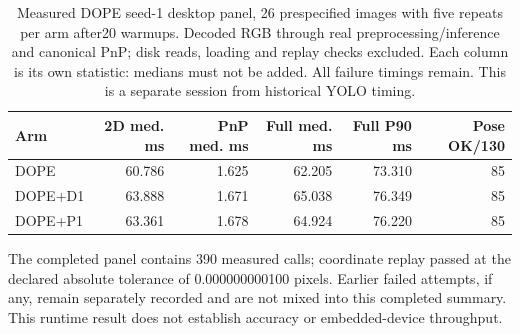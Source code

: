 \begin{table}[t]\centering\small
\caption{Measured DOPE seed-1 desktop panel, 26 prespecified images with five repeats per arm after20 warmups. Decoded RGB through real preprocessing/inference and canonical PnP; disk reads, loading and replay checks excluded. Each column is its own statistic: medians must not be added. All failure timings remain. This is a separate session from historical YOLO timing.}\label{tab:doperuntime}
\begin{tabular}{lrrrrr}\toprule
Arm & 2D med. ms & PnP med. ms & Full med. ms & Full P90 ms & Pose OK/130\\\midrule
DOPE & 60.786 & 1.625 & 62.205 & 73.310 & 85\\
DOPE+D1 & 63.888 & 1.671 & 65.038 & 76.349 & 85\\
DOPE+P1 & 63.361 & 1.678 & 64.924 & 76.220 & 85\\
\bottomrule\end{tabular}
\end{table}
The completed panel contains 390 measured calls; coordinate replay passed at the declared absolute tolerance of 0.000000000100 pixels. Earlier failed attempts, if any, remain separately recorded and are not mixed into this completed summary. This runtime result does not establish accuracy or embedded-device throughput.
